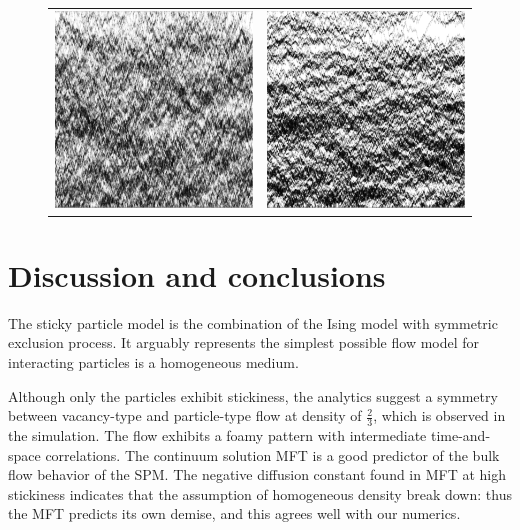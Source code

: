 \documentclass[
reprint, amsmath,amssymb, aps,
]{revtex4-1}
\begin{document}
\begin{figure}[h!]
\begin{center}
\begin{tabular}{c | c}
    \includegraphics[width=0.49\linewidth]{longTime} &\includegraphics[width=0.49\linewidth]{midLongTime}
    \end{tabular}
\end{center}
    \vspace{-2em}
\end{figure}

\section{Discussion and conclusions}

The sticky particle model is the combination of the Ising model with
symmetric exclusion process.  It arguably represents the simplest
possible flow model for interacting particles is a homogeneous medium.

Although only the particles exhibit
stickiness, the analytics suggest a symmetry between vacancy-type and
particle-type flow at density of $\frac{2}{3}$, which is observed in
the simulation.  The flow exhibits a foamy pattern with intermediate
time-and-space correlations.  The continuum solution MFT is a good
predictor of the bulk flow behavior of the SPM.  The negative
diffusion constant found in MFT at high stickiness indicates that the
assumption of homogeneous density break down: thus the MFT predicts
its own demise, and this agrees well with our numerics.
\end{document}
